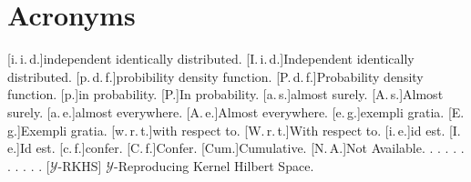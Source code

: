 %




\chapter*{Acronyms}

\begin{acronym}[OCRFsampling]
    [i.\,i.\,d.]{in\-de\-pen\-dent iden\-ti\-cal\-ly
    dis\-tri\-bu\-ted}.
    [I.\,i.\,d.]{In\-de\-pen\-dent iden\-ti\-cal\-ly
    dis\-tri\-bu\-ted}.
    [p.\,d.\,f.]{pro\-bi\-bi\-li\-ty den\-si\-ty func\-tion}.
    [P.\,d.\,f.]{Pro\-ba\-bi\-li\-ty den\-si\-ty func\-tion}.
    [p.]{in pro\-ba\-bi\-li\-ty}.
    [P.]{In pro\-ba\-bi\-li\-ty}.
    [a.\,s.]{al\-most su\-re\-ly}.
    [A.\,s.]{Al\-most su\-re\-ly}.
    [a.\,e.]{al\-most eve\-ry\-where}.
    [A.\,e.]{Al\-most eve\-ry\-where}.
    [e.\,g.]{ex\-em\-pli gra\-tia}.
    [E.\,g.]{Ex\-em\-pli gra\-tia}.
    [w.\,r.\,t.]{with res\-pect to}.
    [W.\,r.\,t.]{With res\-pect to}.
    [i.\,e.]{id est}.
    [I.\,e.]{Id est}.
    [c.\,f.]{confer}.
    [C.\,f.]{Confer}.
    [Cum.]{Cumulative}.
    [N.\,A.]{Not Avai\-la\-ble}.
    .
    .
    .
    .
    .
    .
    .
    .
    .
    .
    [\texorpdfstring{$\mathcal{Y}$}--RKHS]{%
    \texorpdfstring{$\mathcal{Y}$}--Re\-pro\-du\-cing Ker\-nel Hil\-bert
    Spa\-ce}.

\end{acronym}
